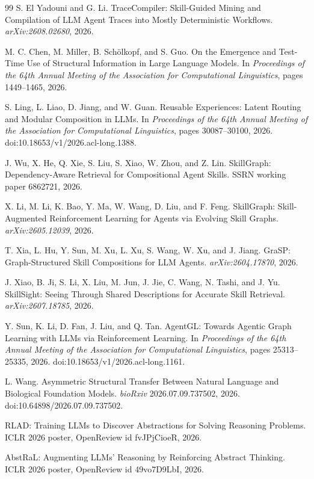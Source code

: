 \begin{thebibliography}{99}
S. El Yadouni and G. Li. TraceCompiler: Skill-Guided Mining and Compilation of LLM Agent Traces into Mostly Deterministic Workflows. \emph{arXiv:2608.02680}, 2026.

M. C. Chen, M. Miller, B. Sch\"olkopf, and S. Guo. On the Emergence and Test-Time Use of Structural Information in Large Language Models. In \emph{Proceedings of the 64th Annual Meeting of the Association for Computational Linguistics}, pages 1449--1465, 2026.

S. Ling, L. Liao, D. Jiang, and W. Guan. Reusable Experiences: Latent Routing and Modular Composition in LLMs. In \emph{Proceedings of the 64th Annual Meeting of the Association for Computational Linguistics}, pages 30087--30100, 2026. doi:10.18653/v1/2026.acl-long.1388.

J. Wu, X. He, Q. Xie, S. Liu, S. Xiao, W. Zhou, and Z. Lin. SkillGraph: Dependency-Aware Retrieval for Compositional Agent Skills. SSRN working paper 6862721, 2026.

X. Li, M. Li, K. Bao, Y. Ma, W. Wang, D. Liu, and F. Feng. SkillGraph: Skill-Augmented Reinforcement Learning for Agents via Evolving Skill Graphs. \emph{arXiv:2605.12039}, 2026.

T. Xia, L. Hu, Y. Sun, M. Xu, L. Xu, S. Wang, W. Xu, and J. Jiang. GraSP: Graph-Structured Skill Compositions for LLM Agents. \emph{arXiv:2604.17870}, 2026.

J. Xiao, B. Ji, S. Li, X. Liu, M. Jun, J. Jie, C. Wang, N. Tashi, and J. Yu. SkillSight: Seeing Through Shared Descriptions for Accurate Skill Retrieval. \emph{arXiv:2607.18785}, 2026.

Y. Sun, K. Li, D. Fan, J. Liu, and Q. Tan. AgentGL: Towards Agentic Graph Learning with LLMs via Reinforcement Learning. In \emph{Proceedings of the 64th Annual Meeting of the Association for Computational Linguistics}, pages 25313--25335, 2026. doi:10.18653/v1/2026.acl-long.1161.

L. Wang. Asymmetric Structural Transfer Between Natural Language and Biological Foundation Models. \emph{bioRxiv} 2026.07.09.737502, 2026. doi:10.64898/2026.07.09.737502.

RLAD: Training LLMs to Discover Abstractions for Solving Reasoning Problems. ICLR 2026 poster, OpenReview id fvJPjCioeR, 2026.

AbstRaL: Augmenting LLMs' Reasoning by Reinforcing Abstract Thinking. ICLR 2026 poster, OpenReview id 49vo7D9LbI, 2026.

\end{thebibliography}
